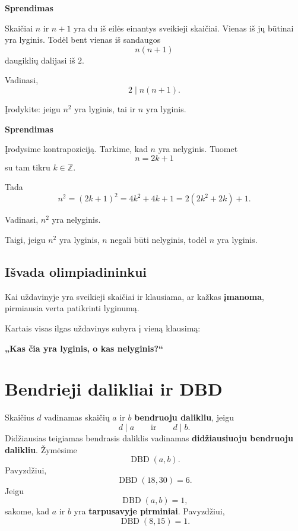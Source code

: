 \documentclass[11pt,a4paper]{scrartcl}
\newenvironment{solution}
    {\begin{list}{}{\setlength{\leftmargin}{10pt}\setlength{\rightmargin}{10pt}}\item[]}
    {\end{list}}
\begin{document}
\begin{solution}
\textbf{Sprendimas}

Skaičiai $n$ ir $n+1$ yra du iš eilės einantys sveikieji skaičiai.
Vienas iš jų būtinai yra lyginis. Todėl bent vienas iš sandaugos
\[
n(n+1)
\]
daugiklių dalijasi iš $2$.

Vadinasi,
\[
2\mid n(n+1).
\]

\end{solution}

\begin{example}

Įrodykite: jeigu $n^2$ yra lyginis, tai ir $n$ yra lyginis.

\end{example}

\begin{solution}
\textbf{Sprendimas}

Įrodysime kontrapoziciją. Tarkime, kad $n$ yra nelyginis. Tuomet
\[
n=2k+1
\]
su tam tikru $k\in\mathbb Z$.

Tada
\[
n^2=(2k+1)^2=4k^2+4k+1
=2(2k^2+2k)+1.
\]

Vadinasi, $n^2$ yra nelyginis.

Taigi, jeigu $n^2$ yra lyginis, $n$ negali būti nelyginis, todėl $n$ yra
lyginis.

\end{solution}

\subsection{Išvada olimpiadininkui}

Kai uždavinyje yra sveikieji skaičiai ir klausiama, ar kažkas
\textbf{įmanoma}, pirmiausia verta patikrinti lyginumą.

Kartais visas ilgas uždavinys subyra į vieną klausimą:

\begin{center}
\textbf{„Kas čia yra lyginis, o kas nelyginis?“}
\end{center}

\section{Bendrieji dalikliai ir DBD}

Skaičius $d$ vadinamas skaičių $a$ ir $b$ \textbf{bendruoju dalikliu}, jeigu
\[
d\mid a
\qquad\text{ir}\qquad
d\mid b.
\]
Didžiausias teigiamas bendrasis daliklis vadinamas
\textbf{didžiausiuoju bendruoju dalikliu}. Žymėsime
\[
\operatorname{DBD}(a,b).
\]
Pavyzdžiui,
\[
\operatorname{DBD}(18,30)=6.
\]
Jeigu
\[
\operatorname{DBD}(a,b)=1,
\]
sakome, kad $a$ ir $b$ yra \textbf{tarpusavyje pirminiai}. Pavyzdžiui,
\[
\operatorname{DBD}(8,15)=1.
\]
\end{document}
